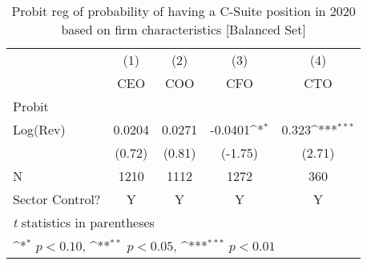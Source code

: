 \begin{table}[htbp]\centering
\def\sym#1{\ifmmode^{#1}\else\(^{#1}\)\fi}
\caption{Probit reg of probability of having a C-Suite position in 2020 based on firm characteristics [Balanced Set]\label{tab1}}
\begin{tabular}{l*{4}{c}}
\toprule
                    &\multicolumn{1}{c}{(1)}&\multicolumn{1}{c}{(2)}&\multicolumn{1}{c}{(3)}&\multicolumn{1}{c}{(4)}\\
                    &\multicolumn{1}{c}{CEO}&\multicolumn{1}{c}{COO}&\multicolumn{1}{c}{CFO}&\multicolumn{1}{c}{CTO}\\
\midrule
Probit              &                     &                     &                     &                     \\
Log(Rev)            &      0.0204         &      0.0271         &     -0.0401\sym{*}  &       0.323\sym{***}\\
                    &      (0.72)         &      (0.81)         &     (-1.75)         &      (2.71)         \\
\midrule
N                   &        1210         &        1112         &        1272         &         360         \\
Sector Control?     &           Y         &           Y         &           Y         &           Y         \\
\bottomrule
\multicolumn{5}{l}{\footnotesize \textit{t} statistics in parentheses}\\
\multicolumn{5}{l}{\footnotesize \sym{*} \(p<0.10\), \sym{**} \(p<0.05\), \sym{***} \(p<0.01\)}\\
\end{tabular}
\end{table}
